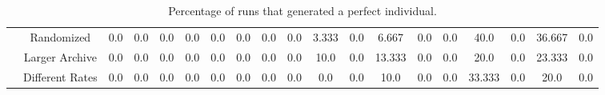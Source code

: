 \begin{table*}[ht]
\begin{adjustbox}{width=1\textwidth}
\begin{tabular}{ c c c c c c c c c c c c c c c c c c c }
 & Randomized & 0.0 & 0.0 & 0.0 & 0.0 & 0.0 & 0.0 & 0.0 & 0.0 & 3.333 & 0.0 & 6.667 & 0.0 & 0.0 & 40.0 & 0.0 & 36.667 & 0.0 \\
 & Larger Archive & 0.0 & 0.0 & 0.0 & 0.0 & 0.0 & 0.0 & 0.0 & 0.0 & 10.0 & 0.0 & 13.333 & 0.0 & 0.0 & 20.0 & 0.0 & 23.333 & 0.0 \\
 & Different Rates & 0.0 & 0.0 & 0.0 & 0.0 & 0.0 & 0.0 & 0.0 & 0.0 & 0.0 & 0.0 & 10.0 & 0.0 & 0.0 & 33.333 & 0.0 & 20.0 & 0.0 \\
\hline
\end{tabular}
\end{adjustbox}
\caption{Percentage of runs that generated a perfect individual.}
\label{table:perfects_found}
\end{table*}